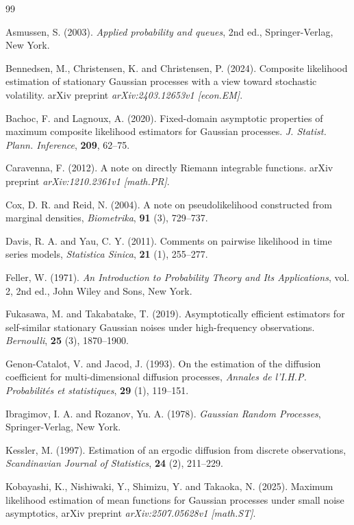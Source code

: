 \documentclass[a4paper,10pt,twoside]{article}
\numberwithin{equation}{section}
\begin{document}
\begin{thebibliography}{99}

 Asmussen, S. (2003). {\it Applied probability and queues}, 2nd ed., Springer-Verlag, New York.

 Bennedsen, M., Christensen, K. and Christensen, P. (2024). Composite likelihood estimation of stationary Gaussian processes with a view toward stochastic volatility. arXiv preprint {\it arXiv:2403.12653v1 [econ.EM]}.

 Bachoc, F. and Lagnoux, A. (2020). Fixed-domain asymptotic properties of maximum composite likelihood estimators for Gaussian processes. {\it J. Statist. Plann. Inference}, {\bf 209}, 62--75.

 Caravenna, F. (2012). A note on directly Riemann integrable functions. arXiv preprint {\it arXiv:1210.2361v1 [math.PR]}.

 Cox, D. R. and Reid, N. (2004). A note on pseudolikelihood constructed from marginal densities, {\it Biometrika}, {\bf 91} (3), 729--737.

 Davis, R. A. and Yau, C. Y. (2011). Comments on pairwise likelihood in time series models, {\it Statistica Sinica}, {\bf 21} (1), 255--277.

 Feller, W. (1971). {\it An Introduction to Probability Theory and Its Applications}, vol. 2, 2nd ed., John Wiley and Sons, New York.

 Fukasawa, M. and Takabatake, T. (2019). Asymptotically efficient estimators for self-similar stationary Gaussian noises under high-frequency observations. {\it Bernoulli}, {\bf 25} (3), 1870--1900.

 Genon-Catalot, V. and Jacod, J. (1993). On the estimation of the diffusion coefficient for multi-dimensional diffusion processes, {\it Annales de l'I.H.P. Probabilit\'es et statistiques}, {\bf 29} (1), 119--151.


 Ibragimov, I. A. and Rozanov, Yu. A. (1978). {\it Gaussian Random Processes}, Springer-Verlag, New York.

 Kessler, M. (1997). Estimation of an ergodic diffusion from discrete observations, {\it Scandinavian Journal of Statistics}, {\bf 24} (2), 211--229.

 Kobayashi, K., Nishiwaki, Y., Shimizu, Y. and Takaoka, N. (2025). Maximum likelihood estimation of mean functions for Gaussian processes under small noise asymptotics, arXiv preprint {\it arXiv:2507.05628v1 [math.ST]}.


\end{thebibliography}
\end{document}
